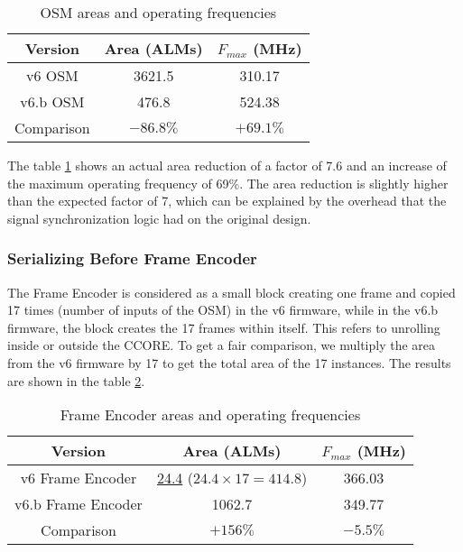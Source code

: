 \begin{itemize}
\begin{table}[ht]
    \centering
    \begin{tabular}{|c|c|c|}
        \hline
        Version & Area (ALMs) & \(F_{max}\) (MHz) \\
        \hline
        v6 OSM & 3621.5 & 310.17 \\
        v6.b OSM & 476.8 & 524.38  \\
        \hline
        Comparison & \(-86.8\%\) & \(+69.1\%\) \\
        \hline
    \end{tabular}
    \caption{OSM areas and operating frequencies}
    \label{tab:osm-optimization}
\end{table}

The table \ref{tab:osm-optimization} shows an actual area reduction of a factor of 7.6 and an increase of the maximum operating frequency of 69\%. The area reduction is slightly higher than the expected factor of 7, which can be explained by the overhead that the signal synchronization logic had on the original design.


\subsubsection{Serializing Before Frame Encoder}

The Frame Encoder is considered as a small block creating one frame and copied 17 times (number of inputs of the OSM) in the v6 firmware, while in the v6.b firmware, the block creates the 17 frames within itself. This refers to unrolling inside or outside the CCORE. To get a fair comparison, we multiply the area from the v6 firmware by 17 to get the total area of the 17 instances. The results are shown in the table \ref{tab:frame-encoder-optimization}.

\begin{table}[ht]
    \centering
    \begin{tabular}{|c|c|c|}
        \hline
        Version & Area (ALMs) & \(F_{max}\) (MHz) \\
        \hline
        v6 Frame Encoder & \underline{24.4} (\(24.4\times17=414.8\)) & 366.03 \\
        v6.b Frame Encoder & 1062.7 & 349.77  \\
        \hline
        Comparison & \(+156\%\) & \(-5.5\%\) \\
        \hline
    \end{tabular}
    \caption{Frame Encoder areas and operating frequencies}
    \label{tab:frame-encoder-optimization}
\end{table}


\end{itemize}
